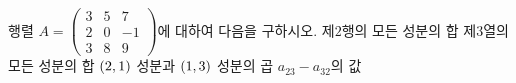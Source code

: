 행렬 $A=\begin{pmatrix} 3 & 5 & 7 \\ 2 & 0 & -1 \\ 3 & 8 & 9 \end{pmatrix}$에 대하여 다음을 구하시오.
 제$2$행의 모든 성분의 합
 제$3$열의 모든 성분의 합
 $(2{,}\mkern3mu\mathopen{}1)$ 성분과 $(1{,}\mkern3mu\mathopen{}3)$ 성분의 곱
 $a_{23}-a_{32}$의 값
